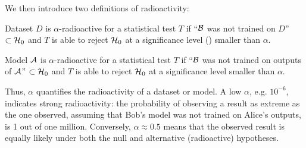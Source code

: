 We then introduce two definitions of radioactivity:
\begin{definition}\label{chap6/def:text_radioactivity}
    Dataset $D$ is $\alpha$-radioactive for a statistical test $T$ if ``$\mathcal B$ was not trained on $D$'' $\subset \mathcal{H}_0$ and
    $T$ is able to reject $\mathcal{H}_0$ at a significance level (\pval) smaller than $\alpha$.
\end{definition}

\begin{definition}\label{chap6/def:model_radioactivity}
    Model $\mathcal A$ is $\alpha$-radioactive for a statistical test $T$ if
    ``$\mathcal B$ was not trained on outputs of $\mathcal A$'' $\subset \mathcal{H}_0$ and $T$ is able to reject $\mathcal{H}_0$ at a significance level smaller than $\alpha$.
\end{definition}

Thus, $\alpha$ quantifies the radioactivity of a dataset or model. 
A low $\alpha$, e.g. $10^{-6}$, indicates strong radioactivity: the probability of observing a result as extreme as the one observed, assuming that Bob's model was not trained on Alice's outputs, is 1 out of one million. 
Conversely, $\alpha\approx 0.5$ means that the observed result is equally likely under both the null and alternative (radioactive) hypotheses.



